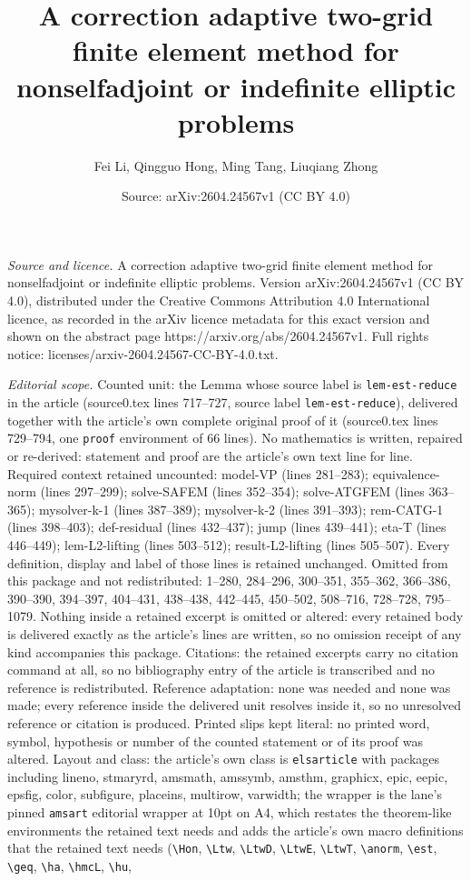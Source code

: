 \documentclass[10pt,a4paper]{amsart}
\title[A correction adaptive two-grid finite element method for non]{A correction adaptive two-grid finite element method for nonselfadjoint or indefinite elliptic problems}
\author{Fei Li, Qingguo Hong, Ming Tang, Liuqiang Zhong}
\date{Source: arXiv:2604.24567v1 (CC BY 4.0)}
\begin{document}
\maketitle

\noindent\emph{Source and licence.} A correction adaptive two-grid finite element method for nonselfadjoint or indefinite elliptic problems. Version arXiv:2604.24567v1 (CC BY 4.0), distributed under the Creative Commons Attribution 4.0 International licence, as recorded in the arXiv licence metadata for this exact version and shown on the abstract page https://arxiv.org/abs/2604.24567v1. Full rights notice: licenses/arxiv-2604.24567-CC-BY-4.0.txt.\par\smallskip

\noindent\textit{Editorial scope.} Counted unit: the Lemma whose source label is \texttt{lem-est-reduce} in the article (source0.tex lines 717--727, source label \texttt{lem-est-reduce}), delivered together with the article's own complete original proof of it (source0.tex lines 729--794, one \texttt{proof} environment of 66 lines). No mathematics is written, repaired or re-derived: statement and proof are the article's own text line for line. Required context retained uncounted: model-VP (lines 281--283); equivalence-norm (lines 297--299); solve-SAFEM (lines 352--354); solve-ATGFEM (lines 363--365); mysolver-k-1 (lines 387--389); mysolver-k-2 (lines 391--393); rem-CATG-1 (lines 398--403); def-residual (lines 432--437); jump (lines 439--441); eta-T (lines 446--449); lem-L2-lifting (lines 503--512); result-L2-lifting (lines 505--507). Every definition, display and label of those lines is retained unchanged. Omitted from this package and not redistributed: 1--280, 284--296, 300--351, 355--362, 366--386, 390--390, 394--397, 404--431, 438--438, 442--445, 450--502, 508--716, 728--728, 795--1079. Nothing inside a retained excerpt is omitted or altered: every retained body is delivered exactly as the article's lines are written, so no omission receipt of any kind accompanies this package. Citations: the retained excerpts carry no citation command at all, so no bibliography entry of the article is transcribed and no reference is redistributed. Reference adaptation: none was needed and none was made; every reference inside the delivered unit resolves inside it, so no unresolved reference or citation is produced. Printed slips kept literal: no printed word, symbol, hypothesis or number of the counted statement or of its proof was altered. Layout and class: the article's own class is \texttt{elsarticle} with packages including lineno, stmaryrd, amsmath, amssymb, amsthm, graphicx, epic, eepic, epsfig, color, subfigure, placeins, multirow, varwidth; the wrapper is the lane's pinned \texttt{amsart} editorial wrapper at 10pt on A4, which restates the theorem-like environments the retained text needs and adds the article's own macro definitions that the retained text needs (\texttt{\textbackslash Hon}, \texttt{\textbackslash Ltw}, \texttt{\textbackslash LtwD}, \texttt{\textbackslash LtwE}, \texttt{\textbackslash LtwT}, \texttt{\textbackslash anorm}, \texttt{\textbackslash est}, \texttt{\textbackslash geq}, \texttt{\textbackslash ha}, \texttt{\textbackslash hmcL}, \texttt{\textbackslash hu}, 
\end{document}
